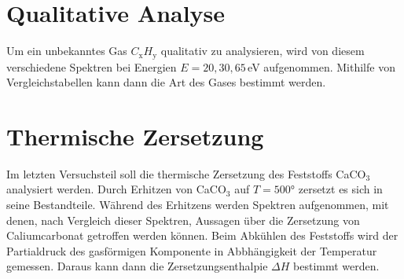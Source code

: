 \section{Qualitative Analyse}
Um ein unbekanntes Gas $C_\text{x}H_\text{y}$ qualitativ zu analysieren, wird von diesem verschiedene Spektren bei Energien $E=20, 30, 65\,$eV aufgenommen. Mithilfe von Vergleichstabellen kann dann die Art des Gases bestimmt werden.

\section{Thermische Zersetzung}
Im letzten Versuchsteil soll die thermische Zersetzung des Feststoffs CaCO$_{3}$ analysiert werden. Durch Erhitzen von CaCO$_{3}$ auf $T=500$° zersetzt es sich in seine Bestandteile. Während des Erhitzens werden Spektren aufgenommen, mit denen, nach Vergleich dieser Spektren, Aussagen über die Zersetzung von Caliumcarbonat getroffen werden können. Beim Abkühlen des Feststoffs  wird der Partialdruck des gasförmigen Komponente in Abbhängigkeit der Temperatur gemessen. Daraus kann dann die Zersetzungsenthalpie $\Delta H$ bestimmt werden.